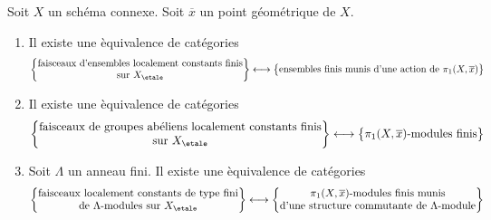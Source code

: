 \begin{lemma}
\label{lemma-locally-constant-on-connected}
Soit $X$ un sch\'ema connexe. Soit $\overline{x}$ un point g\'eom\'etrique de $X$.
\begin{enumerate}
\item Il existe une \`equivalence de cat\'egories
$$
\left\{
\begin{matrix}
\text{faisceaux d'ensembles localement constants finis}\\
\text{sur }X_\etale
\end{matrix}
\right\}
\longleftrightarrow
\left\{
\begin{matrix}
\text{ensembles finis munis d'une action de }\pi_1(X, \overline{x})
\end{matrix}
\right\}
$$
\item Il existe une \`equivalence de cat\'egories
$$
\left\{
\begin{matrix}
\text{faisceaux de groupes ab\'eliens localement constants finis}\\
\text{sur }X_\etale
\end{matrix}
\right\}
\longleftrightarrow
\left\{
\begin{matrix}
\pi_1(X, \overline{x})\text{-modules finis}
\end{matrix}
\right\}
$$
\item Soit $\Lambda$ un anneau fini. Il existe une \`equivalence de cat\'egories
$$
\left\{
\begin{matrix}
\text{faisceaux localement constants de type fini}\\
\text{de }\Lambda\text{-modules sur }X_\etale
\end{matrix}
\right\}
\longleftrightarrow
\left\{
\begin{matrix}
\pi_1(X, \overline{x})\text{-modules finis munis}\\
\text{d'une structure commutante de }\Lambda\text{-module}
\end{matrix}
\right\}
$$
\end{enumerate}
\end{lemma}

